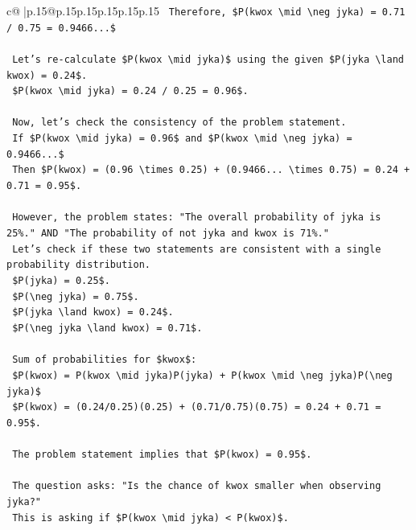 \documentclass{article}
\begin{document}
{\begin{supertabular}{c@{$\;$}|p{.15\linewidth}@{}p{.15\linewidth}p{.15\linewidth}p{.15\linewidth}p{.15\linewidth}p{.15\linewidth}}
{{{\texttt{    Therefore, \$P(kwox \textbackslash{}mid \textbackslash{}neg jyka) = 0.71 / 0.75 = 0.9466...\$} \\
\\ 
\texttt{    Let's re{-}calculate \$P(kwox \textbackslash{}mid jyka)\$ using the given \$P(jyka \textbackslash{}land kwox) = 0.24\$.} \\
\texttt{    \$P(kwox \textbackslash{}mid jyka) = 0.24 / 0.25 = 0.96\$.} \\
\\ 
\texttt{    Now, let's check the consistency of the problem statement.} \\
\texttt{    If \$P(kwox \textbackslash{}mid jyka) = 0.96\$ and \$P(kwox \textbackslash{}mid \textbackslash{}neg jyka) = 0.9466...\$} \\
\texttt{    Then \$P(kwox) = (0.96 \textbackslash{}times 0.25) + (0.9466... \textbackslash{}times 0.75) = 0.24 + 0.71 = 0.95\$.} \\
\\ 
\texttt{    However, the problem states: "The overall probability of jyka is 25\%." AND "The probability of not jyka and kwox is 71\%."} \\
\texttt{    Let's check if these two statements are consistent with a single probability distribution.} \\
\texttt{    \$P(jyka) = 0.25\$.} \\
\texttt{    \$P(\textbackslash{}neg jyka) = 0.75\$.} \\
\texttt{    \$P(jyka \textbackslash{}land kwox) = 0.24\$.} \\
\texttt{    \$P(\textbackslash{}neg jyka \textbackslash{}land kwox) = 0.71\$.} \\
\\ 
\texttt{    Sum of probabilities for \$kwox\$:} \\
\texttt{    \$P(kwox) = P(kwox \textbackslash{}mid jyka)P(jyka) + P(kwox \textbackslash{}mid \textbackslash{}neg jyka)P(\textbackslash{}neg jyka)\$} \\
\texttt{    \$P(kwox) = (0.24/0.25)(0.25) + (0.71/0.75)(0.75) = 0.24 + 0.71 = 0.95\$.} \\
\\ 
\texttt{    The problem statement implies that \$P(kwox) = 0.95\$.} \\
\\ 
\texttt{    The question asks: "Is the chance of kwox smaller when observing jyka?"} \\
\texttt{    This is asking if \$P(kwox \textbackslash{}mid jyka) < P(kwox)\$.} \\
}}}
\end{supertabular}}
\end{document}
